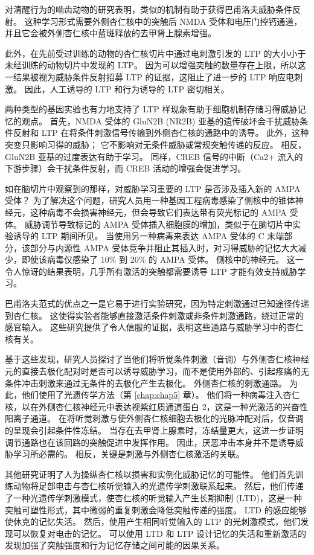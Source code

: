 对清醒行为的啮齿动物的研究表明，类似的机制有助于获得巴甫洛夫威胁条件反射。
这种学习形式需要外侧杏仁核中的突触后 NMDA 受体和电压门控钙通道，并且它会被外侧杏仁核中蓝斑释放的去甲肾上腺素增强。


此外，在先前受过训练的动物的杏仁核切片中通过电刺激引发的 LTP 的大小小于未经训练的动物切片中发现的 LTP。
因为可以增强突触的数量存在上限，所以这一结果被视为威胁条件反射招募 LTP 的证据，这阻止了进一步的 LTP 响应电刺激。
因此，人工诱导的 LTP 和行为诱导的 LTP 密切相关。


两种类型的基因实验也有力地支持了 LTP 样现象有助于细胞机制存储习得威胁记忆的观点。
首先，NMDA 受体的 GluN2B (NR2B) 亚基的遗传破坏会干扰威胁条件反射和 LTP 在将条件刺激信号传输到外侧杏仁核的通路中的诱导。
此外，这种突变只影响习得的威胁；
它不影响对无条件威胁或常规突触传递的反应。
相反，GluN2B 亚基的过度表达有助于学习。 同样，CREB 信号的中断（Ca2+ 流入的下游步骤）会干扰条件反射，而 CREB 活动的增强会促进学习。


如在脑切片中观察到的那样，对威胁学习重要的 LTP 是否涉及插入新的 AMPA 受体？
为了解决这个问题，研究人员用一种基因工程病毒感染了侧核中的锥体神经元，这种病毒不会损害神经元，但会导致它们表达带有荧光标记的 AMPA 受体。
威胁调节导致标记的 AMPA 受体插入细胞膜的增加，类似于在脑切片中实验诱导的 LTP 期间所见。
当使用另一种病毒来表达 AMPA 受体的 C 末端部分，该部分与内源性 AMPA 受体竞争并阻止其插入时，对习得威胁的记忆大大减少，即使该病毒仅感染了 10\% 到 20\% 的 AMPA 受体。
侧核中的神经元。 这一令人惊讶的结果表明，几乎所有激活的突触都需要诱导 LTP 才能有效支持威胁学习。


巴甫洛夫范式的优点之一是它易于进行实验研究，因为特定刺激通过已知途径传递到杏仁核。
这使得实验者能够直接激活条件刺激或非条件刺激通路，绕过正常的感官输入。
这些研究提供了令人信服的证据，表明这些通路与威胁学习中的杏仁核有关。


基于这些发现，研究人员探讨了当他们将听觉条件刺激（音调）与外侧杏仁核神经元的直接去极化配对时是否可以诱导威胁学习，而不是使用外部的、引起疼痛的无条件冲击刺激来通过无条件的去极化产生去极化。
外侧杏仁核的刺激通路。 为此，他们使用了光遗传学方法（第 \ref{chap:chap5} 章）。
他们将一种病毒注入杏仁核，以在外侧杏仁核神经元中表达视紫红质通道蛋白 2，这是一种光激活的兴奋性阳离子通道。
在将听觉刺激与使外侧杏仁核细胞去极化的光脉冲配对后，仅音调的呈现会引起条件性冻结。
当存在去甲肾上腺素时，冻结量更大，这进一步证明调节通路也在该回路的突触促进中发挥作用。
因此，厌恶冲击本身并不是诱导威胁学习所必需的。
相反，关键是刺激与外侧杏仁核激活的关联。


其他研究证明了人为操纵杏仁核以损害和实例化威胁记忆的可能性。
他们首先训练动物将足部电击与杏仁核听觉输入的光遗传学刺激联系起来。
然后，他们传递了一种光遗传学刺激模式，使杏仁核的听觉输入产生长期抑制 (LTD)，这是一种突触可塑性形式，其中微弱的重复刺激会降低突触传递的强度。
LTD 的感应能够使休克的记忆失活。
然后，使用产生相同听觉输入的 LTP 的光刺激模式，他们发现可以恢复对电击的记忆。
可以使用 LTD 和 LTP 设计记忆的失活和重新激活的发现加强了突触强度和行为记忆存储之间可能的因果关系。


